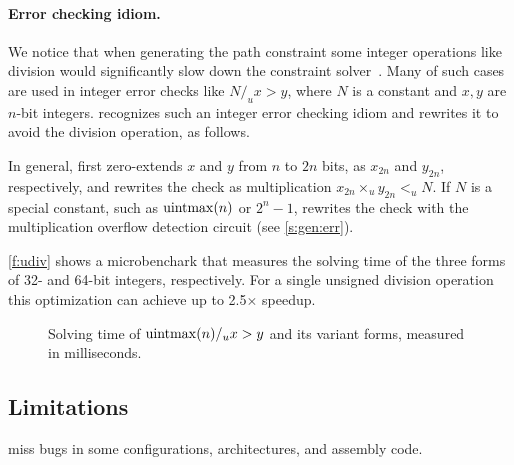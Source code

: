 \paragraph{Error checking idiom.}

We notice that when generating the path constraint some integer
operations like division would significantly slow down the constraint
solver~\cite{brummayer:perf}.  Many of such cases are used in integer
error checks like $N /_u x > y$, where $N$ is a constant and $x,
y$ are $n$-bit integers.  \sys recognizes such an integer error
checking idiom and rewrites it to avoid the division operation, as
follows.

In general, \sys first zero-extends $x$ and $y$ from $n$ to $2n$
bits, as $x_{2n}$ and $y_{2n}$, respectively, and rewrites the check
as multiplication $x_{2n} \times_u y_{2n} <_u N$.  If $N$ is a
special constant, such as $\operatorname{uintmax}(n)$ or $2^n-1$, \sys rewrites
the check with the multiplication overflow detection circuit (see
\autoref{s:gen:err}).

\autoref{f:udiv} shows a microbenchark that measures the solving
time of the three forms of 32- and 64-bit integers, respectively.
For a single unsigned division operation this optimization can
achieve up to 2.5$\times$ speedup.

\begin{figure}
\centering

\caption{Solving time of $\operatorname{uintmax}(n) /_u x > y$ and its variant
forms, measured in milliseconds.}
\label{f:udiv}
\end{figure}

\subsection{Limitations}

miss bugs in some configurations, architectures,
and assembly code.
